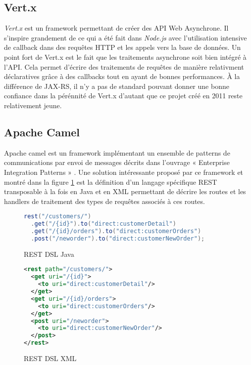 \documentclass[a4paper, 11pt]{report}
\begin{document}
\subsection{Vert.x}

\emph{Vert.x} est un framework permettant de créer des API Web
Asynchrone. Il s'inspire grandement de ce qui a été fait dans
\emph{Node.js} avec l'utilisation intensive de callback dans des
requêtes HTTP et les appels vers la base de données. Un point fort de
Vert.x est le fait que les traitements asynchrone soit bien intégré à
l'API. Cela permet d'écrire des traitements de requêtes de manière
relativment déclaratives grâce à des callbacks tout en ayant de bonnes
performances. À la différence de JAX-RS, il n'y a pas de standard
pouvant donner une bonne confiance dans la pérénnité de Vert.x
d'autant que ce projet créé en 2011 reste relativement jeune.

\subsection{Apache Camel}

Apache camel est un framework implémentant un ensemble de patterns de
communications par envoi de messages décrits dans l'ouvrage «
Enterprise Integration Patterns » \cite{hohpe2003enterprise}. Une
solution intéressante proposé par ce framework et montré dans la
figure \ref{fig:restdsl} est la définition d'un langage spécifique
REST transposable à la fois en Java et en XML permettant de décrire
les routes et les handlers de traitement des types de requêtes
associés à ces routes.

\begin{figure}
  \ContinuedFloat*
  \begin{lstlisting}[language=java]
rest("/customers/")
  .get("/{id}").to("direct:customerDetail")
  .get("/{id}/orders").to("direct:customerOrders")
  .post("/neworder").to("direct:customerNewOrder");
  \end{lstlisting}
  \caption{REST DSL Java}
\end{figure}

\begin{figure}
  \ContinuedFloat
  \begin{lstlisting}[language=xml]
<rest path="/customers/">
  <get uri="/{id}">
    <to uri="direct:customerDetail"/>
  </get>
  <get uri="/{id}/orders">
    <to uri="direct:customerOrders"/>
  </get>
  <post uri="/neworder">
    <to uri="direct:customerNewOrder"/>
  </post>
</rest>
  \end{lstlisting}
  \caption{REST DSL XML}
  \label{fig:restdsl}
\end{figure}
\end{document}
